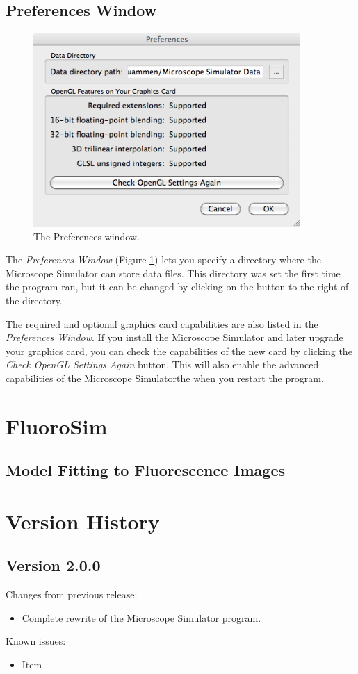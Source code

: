 \documentclass[11pt,titlepage]{article}
\begin{document}
\subsection{Preferences Window}
\label{sec:PreferencesWindow}

\begin{figure}[htbp] %
   \centering
   \includegraphics[width=4in]{images/PreferencesWindow} 
   \caption{The Preferences window.}
   \label{fig:PreferencesWindow}
\end{figure}

The \emph{Preferences Window} (Figure \ref{fig:PreferencesWindow}) lets you specify a directory where the Microscope Simulator can store data files. This directory was set the first time the program ran, but it can be changed by clicking on the button to the right of the directory.

The required and optional graphics card capabilities are also listed in the \emph{Preferences Window}. If you install the Microscope Simulator and later upgrade your graphics card, you can check the capabilities of the new card by clicking the \emph{Check OpenGL Settings Again} button. This will also enable the advanced capabilities of the Microscope Simulatorthe when you restart the program.

\section{FluoroSim}
\label{sec:FluoroSim}

\subsection{Model Fitting to Fluorescence Images}
\label{sec:ModelFittingToFluorescenceImages}



\section{Version History}

\subsection{Version 2.0.0}

\noindent
Changes from previous release:
\begin{itemize}
\item Complete rewrite of the Microscope Simulator program.
\end{itemize}

\noindent
Known issues:
\begin{itemize}
\item Item
\end{itemize}
\end{document}
